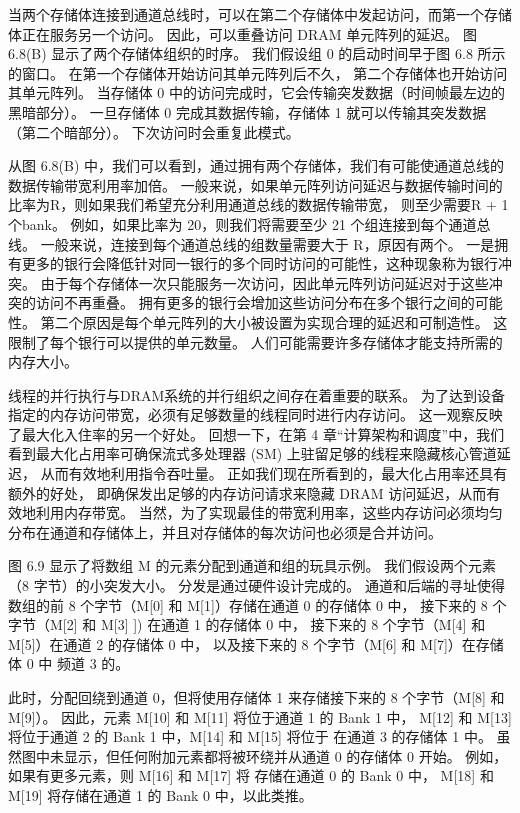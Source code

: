 当两个存储体连接到通道总线时，可以在第二个存储体中发起访问，而第一个存储体正在服务另一个访问。 
因此，可以重叠访问 DRAM 单元阵列的延迟。 图 6.8(B) 显示了两个存储体组织的时序。 
我们假设组 0 的启动时间早于图 6.8 所示的窗口。 在第一个存储体开始访问其单元阵列后不久，
第二个存储体也开始访问其单元阵列。 当存储体 0 中的访问完成时，它会传输突发数据（时间帧最左边的黑暗部分）。 
一旦存储体 0 完成其数据传输，存储体 1 就可以传输其突发数据（第二个暗部分）。 下次访问时会重复此模式。

从图 6.8(B) 中，我们可以看到，通过拥有两个存储体，我们有可能使通道总线的数据传输带宽利用率加倍。 
一般来说，如果单元阵列访问延迟与数据传输时间的比率为R，则如果我们希望充分利用通道总线的数据传输带宽，
则至少需要R + 1个bank。 例如，如果比率为 20，则我们将需要至少 21 个组连接到每个通道总线。 
一般来说，连接到每个通道总线的组数量需要大于 R，原因有两个。 
一是拥有更多的银行会降低针对同一银行的多个同时访问的可能性，这种现象称为银行冲突。 
由于每个存储体一次只能服务一次访问，因此单元阵列访问延迟对于这些冲突的访问不再重叠。 
拥有更多的银行会增加这些访问分布在多个银行之间的可能性。 
第二个原因是每个单元阵列的大小被设置为实现合理的延迟和可制造性。 这限制了每个银行可以提供的单元数量。 
人们可能需要许多存储体才能支持所需的内存大小。

线程的并行执行与DRAM系统的并行组织之间存在着重要的联系。 
为了达到设备指定的内存访问带宽，必须有足够数量的线程同时进行内存访问。 
这一观察反映了最大化入住率的另一个好处。 
回想一下，在第 4 章“计算架构和调度”中，我们看到最大化占用率可确保流式多处理器 (SM) 上驻留足够的线程来隐藏核心管道延迟，
从而有效地利用指令吞吐量。 正如我们现在所看到的，最大化占用率还具有额外的好处，
即确保发出足够的内存访问请求来隐藏 DRAM 访问延迟，从而有效地利用内存带宽。 
当然，为了实现最佳的带宽利用率，这些内存访问必须均匀分布在通道和存储体上，并且对存储体的每次访问也必须是合并访问。

图 6.9 显示了将数组 M 的元素分配到通道和组的玩具示例。 我们假设两个元素（8 字节）的小突发大小。 
分发是通过硬件设计完成的。 通道和后端的寻址使得数组的前 8 个字节（M[0] 和 M[1]）存储在通道 0 的存储体 0 中，
接下来的 8 个字节（M[2] 和 M[3] ]) 在通道 1 的存储体 0 中，
接下来的 8 个字节（M[4] 和 M[5]）在通道 2 的存储体 0 中，
以及接下来的 8 个字节（M[6] 和 M[7]）在存储体 0 中 频道 3 的。

此时，分配回绕到通道 0，但将使用存储体 1 来存储接下来的 8 个字节（M[8] 和 M[9]）。 
因此，元素 M[10] 和 M[11] 将位于通道 1 的 Bank 1 中，
M[12] 和 M[13] 将位于通道 2 的 Bank 1 中，M[14] 和 M[15] 将位于 在通道 3 的存储体 1 中。
虽然图中未显示，但任何附加元素都将被环绕并从通道 0 的存储体 0 开始。
例如，如果有更多元素，则 M[16] 和 M[17] 将 存储在通道 0 的 Bank 0 中，
M[18] 和 M[19] 将存储在通道 1 的 Bank 0 中，以此类推。

